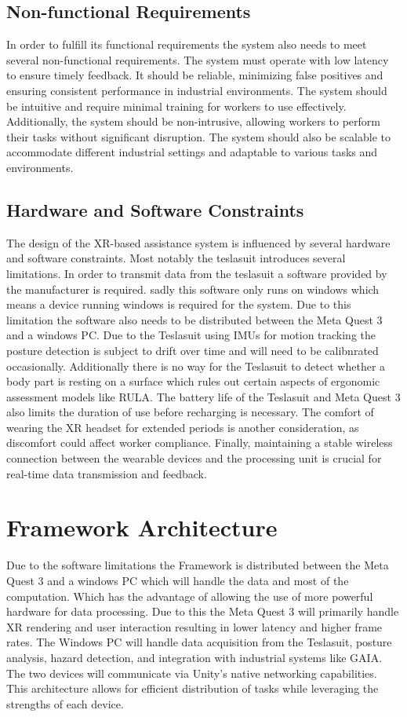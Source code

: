 \subsection{Non-functional Requirements}
In order to fulfill its functional requirements the system also needs to meet several non-functional requirements. 
The system must operate with low latency to ensure timely feedback. It should be reliable, minimizing false positives and ensuring consistent performance in industrial environments. The system should be intuitive and require minimal training for workers to use effectively. Additionally, the system should be non-intrusive, allowing workers to perform their tasks without significant disruption. The system should also be scalable to accommodate different industrial settings and adaptable to various tasks and environments.

\subsection{Hardware and Software Constraints}
The design of the XR-based assistance system is influenced by several hardware and software constraints. 
Most notably the teslasuit introduces several limitations. In order to transmit data from the teslasuit a software provided by the manufacturer is required. sadly this software only runs on windows which means a device running windows is required for the system. Due to this limitation the software also needs to be distributed between the Meta Quest 3 and a windows PC. Due to the Teslasuit using IMUs for motion tracking the posture detection is subject to drift over time and will need to be calibnrated occasionally. Additionally there is no way for the Teslasuit to detect whether a body part is resting on a surface which rules out certain aspects of ergonomic assessment models like RULA. The battery life of the Teslasuit and Meta Quest 3 also limits the duration of use before recharging is necessary. The comfort of wearing the XR headset for extended periods is another consideration, as discomfort could affect worker compliance. Finally, maintaining a stable wireless connection between the wearable devices and the processing unit is crucial for real-time data transmission and feedback.

\section{Framework Architecture}
Due to the software limitations the Framework is distributed between the Meta Quest 3 and a windows PC which will handle the data and most of the computation. Which has the advantage of allowing the use of more powerful hardware for data processing. Due to this the Meta Quest 3 will primarily handle XR rendering and user interaction resulting in lower latency and higher frame rates. The Windows PC will handle data acquisition from the Teslasuit, posture analysis, hazard detection, and integration with industrial systems like GAIA. The two devices will communicate via Unity's native networking capabilities. This architecture allows for efficient distribution of tasks while leveraging the strengths of each device.

